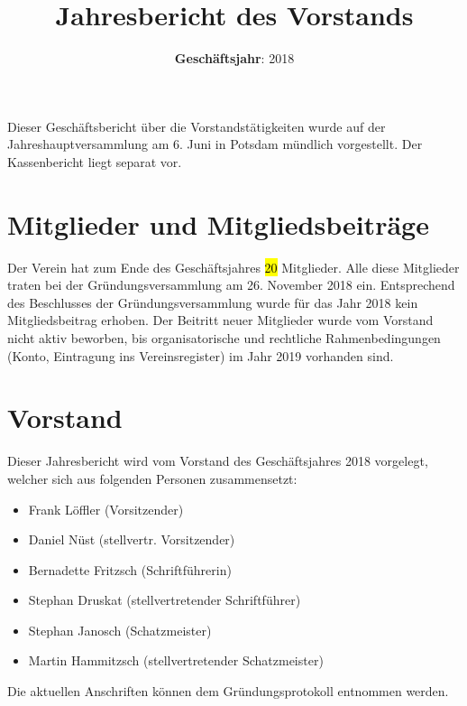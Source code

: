 \documentclass[a4paper]{article}
\title{Jahresbericht des Vorstands}
\author{\textbf{Geschäftsjahr}: 2018}
\begin{document}
\maketitle


Dieser Geschäftsbericht über die Vorstandstätigkeiten wurde auf der Jahreshauptversammlung am 6. Juni in Potsdam mündlich vorgestellt.
Der Kassenbericht liegt separat vor.

\section{Mitglieder und Mitgliedsbeiträge}

Der Verein hat zum Ende des Geschäftsjahres \hl{20} Mitglieder.
Alle diese Mitglieder traten bei der Gründungsversammlung am 26. November 2018 ein.
Entsprechend des Beschlusses der Gründungsversammlung wurde für das Jahr 2018 kein Mitgliedsbeitrag erhoben.
Der Beitritt neuer Mitglieder wurde vom Vorstand nicht aktiv beworben, bis organisatorische und rechtliche Rahmenbedingungen (Konto, Eintragung ins Vereinsregister) im Jahr 2019 vorhanden sind.

\section{Vorstand}

Dieser Jahresbericht wird vom Vorstand des Geschäftsjahres 2018 vorgelegt, welcher sich aus folgenden Personen zusammensetzt:

\begin{itemize}
  \item Frank Löffler (Vorsitzender)
  \item Daniel Nüst (stellvertr. Vorsitzender)
  \item Bernadette Fritzsch (Schriftführerin)
  \item Stephan Druskat (stellvertretender Schriftführer)
  \item Stephan Janosch (Schatzmeister)
  \item Martin Hammitzsch (stellvertretender Schatzmeister)
\end{itemize}

Die aktuellen Anschriften können dem Gründungsprotokoll entnommen werden.
\end{document}
